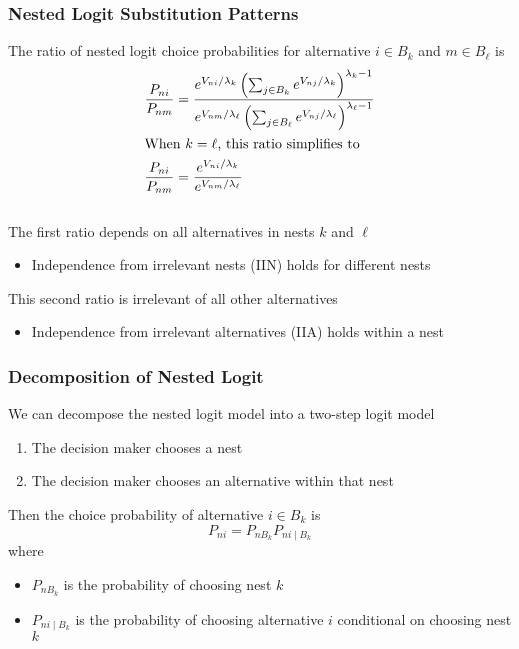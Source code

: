 \documentclass{beamer}
\begin{document}
\begin{frame}\frametitle{Nested Logit Substitution Patterns}
    The ratio of nested logit choice probabilities for alternative $i \in B_k$ and $m \in B_{\ell}$ is
    \begin{align*}
    	\frac{P_{ni}}{P_{nm}} &= \frac{e^{V_{ni} / \lambda_k} \left( \sum_{j \in B_k} e^{V_{nj} / \lambda_k} \right)^{\lambda_k - 1}}{e^{V_{nm} / \lambda_{\ell}} \left( \sum_{j \in B_{\ell}} e^{V_{nj} / \lambda_{\ell}} \right)^{\lambda_{\ell} - 1}} \\
    	\intertext{When $k = \ell$, this ratio simplifies to}
    	\frac{P_{ni}}{P_{nm}} &= \frac{e^{V_{ni} / \lambda_k}}{e^{V_{nm} / \lambda_{\ell}}}
    \end{align*} \\
    \vspace{2ex}
	The first ratio depends on all alternatives in nests $k$ and $\ell$
	\begin{itemize}
		\item Independence from irrelevant nests (IIN) holds for different nests
	\end{itemize}
	\vspace{2ex}
    This second ratio is irrelevant of all other alternatives 
    \begin{itemize}
    	\item Independence from irrelevant alternatives (IIA) holds within a nest
    \end{itemize}
\end{frame}

\begin{frame}\frametitle{Decomposition of Nested Logit}
    We can decompose the nested logit model into a two-step logit model
    \begin{enumerate}
    	\item The decision maker chooses a nest
    	\item The decision maker chooses an alternative within that nest
    \end{enumerate}
    \vspace{2ex}
    Then the choice probability of alternative $i \in B_k$ is
    $$P_{ni} = P_{nB_k} P_{ni \mid B_k}$$
    where
    \begin{itemize}
    	\item $P_{nB_k}$ is the probability of choosing nest $k$
    	\item $P_{ni \mid B_k}$ is the probability of choosing alternative $i$ conditional on choosing nest $k$
    \end{itemize}
\end{frame}
\end{document}
